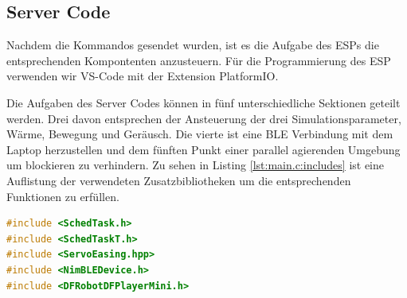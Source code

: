 \subsection{Server Code} \label{Server Code}
Nachdem die Kommandos gesendet wurden, ist es die Aufgabe des ESPs die entsprechenden Kompontenten anzusteuern. 
Für die Programmierung des ESP verwenden wir VS-Code mit der Extension PlatformIO.
\par\vspace{1em}
\noindent
Die Aufgaben des Server Codes können in fünf unterschiedliche Sektionen geteilt werden. Drei davon entsprechen der Ansteuerung der drei 
Simulationsparameter, Wärme, Bewegung und Geräusch. Die vierte ist eine BLE Verbindung mit dem Laptop herzustellen und dem fünften Punkt
einer parallel agierenden Umgebung um blockieren zu verhindern. Zu sehen in Listing \ref{lst:main.c:includes} ist eine Auflistung der verwendeten Zusatzbibliotheken
um die entsprechenden Funktionen zu erfüllen. 
\begin{lstlisting}[language=C++,caption={verwendete Zusatzbibliotheken im Server Code }, label={lst:main.c:includes}, firstnumber=1]
#include <SchedTask.h>
#include <SchedTaskT.h>
#include <ServoEasing.hpp>
#include <NimBLEDevice.h>
#include <DFRobotDFPlayerMini.h> 
\end{lstlisting}
\noindent

